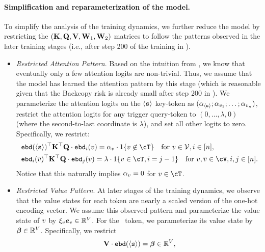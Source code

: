 \paragraph{Simplification and reparameterization of the model.} To simplify the analysis of the training dynamics, we further reduce the model by restricting the $({\mathbf K}, {\mathbf Q}, {\mathbf V}, {\mathbf W}_1, {\mathbf W}_2)$ matrices to follow the patterns observed in the later training stages (i.e., after step 200 of the training in ). 
\begin{itemize}[leftmargin=2em]
\setlength\itemsep{0pt}
\item \textit{Restricted Attention Pattern}. Based on the intuition from , we know that eventually only a few attention logits are non-trivial. Thus, we assume that the model has learned the attention pattern by this stage (which is reasonable given that the Backcopy risk is already small after step 200 in ). We parameterize the attention logits on the $\texttt{$\langle \texttt{s}\rangle$}$ key-token as $(\alpha_{\texttt{$\langle \texttt{s}\rangle$}}; \alpha_{v_1}; \ldots; \alpha_{v_n})$, restrict the attention logits for any trigger query-token to $(0, \ldots, \lambda, 0)$ (where the second-to-last coordinate is $\lambda$), and set all other logits to zero. Specifically, we restrict:
\begin{equation}\label{eqn:simplification_TF_1}
\begin{aligned}
&~\embd(\bos)^\top \bK^\top \bQ \cdot \embd_i(\tok) =\sink_\tok \cdot 1 \{ v \not\in \cT \}~~~\text{for } \tok\in\vocab, i \in [n], \\
&~ \embd_i(\bar \tok)^\top \bK^\top \bQ \cdot \embd_j(\tok) = \lambda \cdot 1\{ \tok \in \cT, i = j-1 \} ~~~\text{for } \tok, \bar \tok \in \cV, i, j \in [n]. 
\end{aligned}
\end{equation}
Notice that this naturally implies $\alpha_v = 0$ for $v \in \cT$. 
\item \textit{Restricted Value Pattern}. At later stages of the training dynamics, we observe that the value states for each token are nearly a scaled version of the one-hot encoding vector. We assume this observed pattern and parameterize the value state of $v$ by $\xi_v \bm{e}_{v} \in \mathbb{R}^V$. For the \bos~token, we parameterize its value state by $\boldsymbol{\beta} \in \mathbb{R}^{V}$. Specifically, we restrict
\begin{equation}\label{eqn:simplification_TF_2}
\begin{aligned}
&~ \bV \cdot \embd(\bos)  = \vecvalue \in \R^{V}, \\

\end{aligned}
\end{equation}
\end{itemize}
